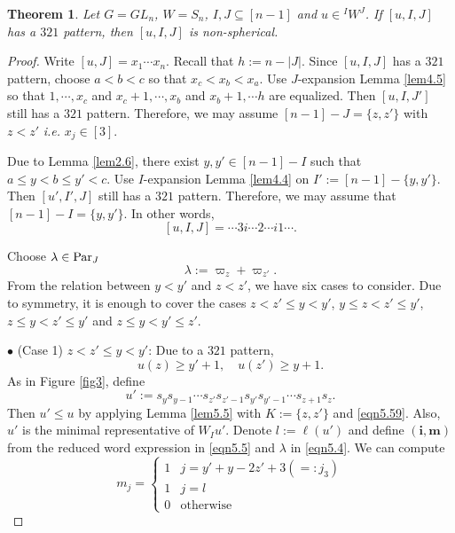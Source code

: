 \documentclass[12pt]{amsart}
\newtheorem{theorem}{Theorem}[section]
\theoremstyle{definition}
\theoremstyle{remark}
\newcommand{\Parj}{{\rm Par}_J}
\begin{document}
\begin{theorem}\label{thm5.2}
Let $G= GL_n$, $W=S_n$, $I, J \subseteq [n-1]$ and $u \in {}^I W^J$. If $[u,I,J]$ has a $321$ pattern, then $[u,I,J]$ is non-spherical.
\end{theorem}
\begin{proof}
Write $[u,J] = x_1 \cdots x_n$. Recall that $h:= n - |J|$. Since $[u,I,J]$ has a $321$ pattern, choose $a<b<c$ so that $x_c < x_b < x_a$. Use $J$-expansion Lemma \ref{lem4.5} so that $1 , \cdots , x_c$ and $x_c + 1 , \cdots , x_b$ and $x_b +1 , \cdots h$ are equalized. Then $[u, I , J']$ still has a $321$ pattern. Therefore, we may assume $[n-1] - J = \{z, z'\}$ with $z<z'$ \textit{i.e.} $x_j \in [3]$.

Due to Lemma \ref{lem2.6}, there exist $y , y' \in [n-1]-I$ such that $a \leq y < b \leq y' <c$. Use $I$-expansion Lemma \ref{lem4.4} on $I':= [n-1]-\{y,y'\}$. Then $[u',I',J]$ still has a $321$ pattern. Therefore, we may assume that $[n-1] - I = \{y , y'\}$. In other words,
\begin{equation}\label{eqn5.3}
[u,I,J] = \cdots 3i\cdots 2\cdots i1\cdots  .
\end{equation}

Choose $\lambda \in \Parj$
\begin{equation}\label{eqn5.4}
\lambda:= \varpi_z + \varpi_{z'}.
\end{equation}
From the relation between $y<y'$ and $z< z'$, we have six cases to consider. Due to symmetry, it is enough to cover the cases $z<z' \leq y<y'$, $y \leq z < z' \leq y'$, $z \leq y < z' \leq y'$ and $z\leq y<y' \leq z'$.

$\bullet$ (Case 1) $z<z' \leq y<y'$: Due to a $321$ pattern,
\begin{equation}\label{eqn5.59}
u(z) \geq y'+1, \quad u(z') \geq y+1.
\end{equation} 
As in Figure \ref{fig3}, define
\begin{equation}\label{eqn5.5}
u':=s_y s_{y-1} \cdots s_{z'}s_{z'-1} s_{y'} s_{y'-1} \cdots s_{z+1}s_z.
\end{equation}
Then $u' \leq u$ by applying Lemma \ref{lem5.5} with $K:=\{z,z'\}$ and \eqref{eqn5.59}. Also, $u'$ is the minimal representative of $W_Iu'$. Denote $l:= \ell (u')$ and define $(\mathbf{i}, \mathbf{m})$ from the reduced word expression in \eqref{eqn5.5} and $\lambda$ in \eqref{eqn5.4}. We can compute
\begin{equation}\label{eqn5.6}
m_j = 
\begin{cases}
1 & j = y'+y-2z'+3 (=:j_3) \\
1 & j = l \\
0 & \text{otherwise}
\end{cases}
\end{equation}


\end{proof}
\end{document}
